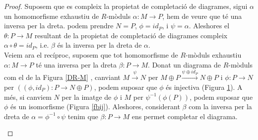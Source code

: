 \begin{proof} Suposem que es compleix la propietat de completació de diagrames, sigui $\alpha$ un  homomorfisme exhaustiu de $R$-mòduls $\alpha: M\rightarrow P$, hem de veure que té una inversa per la dreta. podem prendre $N=P$, $\phi = id_P$, i $\psi = \alpha$. Aleshores el $\theta:P \rightarrow M$ resultant de la propietat de completació de diagrames compleix $\alpha \circ \theta = id_P$, i.e. $\beta$ és la inversa per la dreta de $\alpha$.
\\
\indent Veiem ara el recíproc, suposem que tot homomorfisme de $R$-mòduls exhaustiu $\alpha : M \rightarrow P$ té una inversa per la dreta $\beta : P \rightarrow M$. Donat un diagrama de $R$-mòduls com el de la Figura \ref{DR-M} , canviant $M \xrightarrow{\psi} N$ per $M \oplus P \xrightarrow{\psi \oplus id_P} N \oplus P$ i $\phi:P\rightarrow N$ per $((\phi, id_P):P \rightarrow N\oplus P)$, podem suposar que $\phi$ és injectiva (Figura \ref{finj}). A més, si canviem $N$ per la imatge de $\phi$ i $M$ per $\psi^{-1}(\phi(P))$, podem suposar que $\phi$ és un isomorfisme (Figura \ref{fbij}). Aleshores, considerant $\beta$ com la inversa per la dreta de $\alpha = \phi^{-1} \circ \psi$ tenim que $\beta : P \rightarrow M$ ens permet completar el diagrama.






\begin{figure}[!htb]

\begin{center}
\end{center}
\endminipage\hfill
{}
\begin{center}
\caption{} \label{finj}
\end{center}


\end{figure}
\end{proof}
